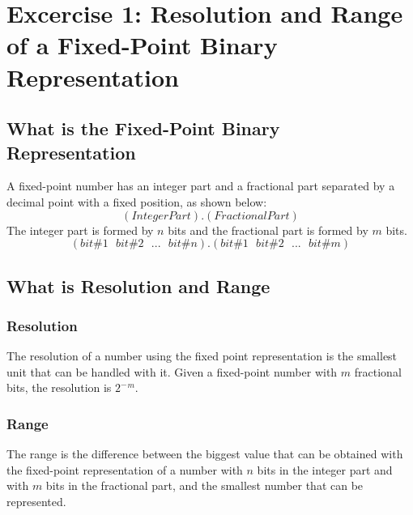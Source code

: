 

%



\section{\color{olive}Excercise 1: Resolution and Range of a Fixed-Point Binary Representation}

\subsection{\color{purple}What is the Fixed-Point Binary Representation}
A fixed-point number has an integer part and a fractional part separated by a decimal point with a fixed position, as shown below:
$$ (Integer Part).(Fractional Part)$$
The integer part is formed by $n$ bits and the fractional part is formed by $m$ bits.
$$ (bit \#1\ \ \ bit \#2\ \ \ ...\ \ \ bit \#n).(bit \#1\ \ \ bit \#2\ \ \ ...\ \ \ bit \#m)$$

\subsection{\color{purple}What is Resolution and Range}
\subsubsection{\color{red}Resolution}
The resolution of a number using the fixed point representation is the smallest unit that can be handled with it.
Given a fixed-point number with $m$ fractional bits, the resolution is $2^- $$^m$. %
\subsubsection{\color{red}Range}
The range is the difference between the biggest value that can be obtained with the fixed-point representation of a number with $n$ bits in the integer part and with $m$ bits in the fractional part, and the smallest number that can be represented.

